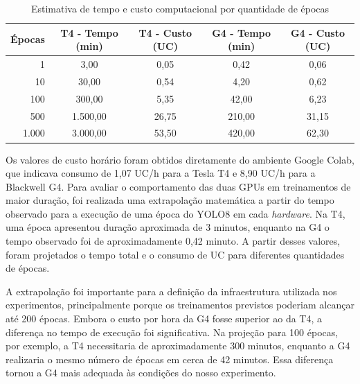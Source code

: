 \begin{table}[H]
    \caption{Estimativa de tempo e custo computacional por quantidade de épocas}
    \label{tab:custo-computacional}
    \centering
    \small
    \begin{tabular}{rcccc}
        \toprule
        \textbf{Épocas} & \textbf{T4 - Tempo (min)} & \textbf{T4 - Custo (UC)}
            & \textbf{G4 - Tempo (min)} & \textbf{G4 - Custo (UC)} \\
        \midrule
        1     &     3,00 &  0,05 &   0,42 &  0,06 \\
        10    &    30,00 &  0,54 &   4,20 &  0,62 \\
        100   &   300,00 &  5,35 &  42,00 &  6,23 \\
        500   & 1.500,00 & 26,75 & 210,00 & 31,15 \\
        1.000 & 3.000,00 & 53,50 & 420,00 & 62,30 \\
        \bottomrule
    \end{tabular}
\end{table}
\vspace{-1em}

Os valores de custo horário foram obtidos diretamente do ambiente Google Colab, que indicava
consumo de 1,07 UC/h para a Tesla T4 e 8,90 UC/h para a Blackwell G4. Para avaliar o
comportamento das duas GPUs em treinamentos de maior duração, foi realizada uma extrapolação
matemática a partir do tempo observado para a execução de uma época do YOLO8 em cada
\textit{hardware}. Na T4, uma época apresentou duração aproximada de 3 minutos, enquanto na
G4 o tempo observado foi de aproximadamente 0,42 minuto. A partir desses valores, foram
projetados o tempo total e o consumo de UC para diferentes quantidades de épocas.

A extrapolação foi importante para a definição da infraestrutura utilizada nos experimentos,
principalmente porque os treinamentos previstos poderiam alcançar até 200 épocas. Embora o
custo por hora da G4 fosse superior ao da T4, a diferença no tempo de execução foi
significativa. Na projeção para 100 épocas, por exemplo, a T4 necessitaria de aproximadamente
300 minutos, enquanto a G4 realizaria o mesmo número de épocas em cerca de 42 minutos. Essa
diferença tornou a G4 mais adequada às condições do nosso experimento.

